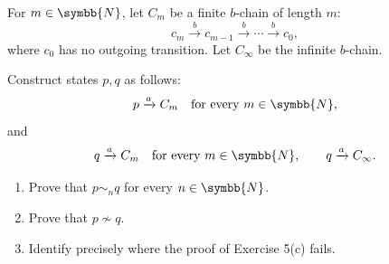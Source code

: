 \documentclass[11pt,a4paper,lmodern]{tutorial}
\DeclareRobustCommand{\N}{\symbb{N}}
\DeclareRobustCommand{\N}{\mathbb{N}}
\newcommand{\trans}[1]{\xrightarrow{#1}}
\begin{document}
\begin{exercise}
For $m\in\N$, let $C_m$ be a finite $b$-chain of length $m$:
\[
  c_m \trans{b} c_{m-1}\trans{b}\cdots
  \trans{b}c_0,
\]
where $c_0$ has no outgoing transition.
Let $C_\infty$ be the infinite $b$-chain.

Construct states $p,q$ as follows:
\[
  p\trans{a} C_m \quad\text{for every }m\in\N,
\]
and
\[
  q\trans{a} C_m \quad\text{for every }m\in\N,
  \qquad
  q\trans{a} C_\infty.
\]

\begin{enumerate}[label=(\alph*)]
\item Prove that $p\sim_n q$ for every $n\in\N$.
\item Prove that $p\not\sim q$.
\item Identify precisely where the proof of Exercise 5(c) fails.
\end{enumerate}
\end{exercise}
\end{document}

